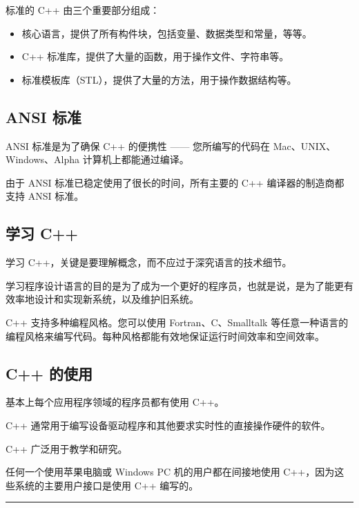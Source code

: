 \documentclass[
]{article}
\providecommand{\tightlist}{%
  \setlength{\itemsep}{0pt}\setlength{\parskip}{0pt}}
\begin{document}
标准的 C++ 由三个重要部分组成：

\begin{itemize}
\tightlist
\item
  核心语言，提供了所有构件块，包括变量、数据类型和常量，等等。
\item
  C++ 标准库，提供了大量的函数，用于操作文件、字符串等。
\item
  标准模板库（STL），提供了大量的方法，用于操作数据结构等。
\end{itemize}

\hypertarget{ansi-ux6807ux51c6}{%
\subsection{ANSI 标准}\label{ansi-ux6807ux51c6}}

ANSI 标准是为了确保 C++ 的便携性 ------ 您所编写的代码在
Mac、UNIX、Windows、Alpha 计算机上都能通过编译。

由于 ANSI 标准已稳定使用了很长的时间，所有主要的 C++
编译器的制造商都支持 ANSI 标准。

\hypertarget{ux5b66ux4e60-c}{%
\subsection{学习 C++}\label{ux5b66ux4e60-c}}

学习 C++，关键是要理解概念，而不应过于深究语言的技术细节。

学习程序设计语言的目的是为了成为一个更好的程序员，也就是说，是为了能更有效率地设计和实现新系统，以及维护旧系统。

C++ 支持多种编程风格。您可以使用 Fortran、C、Smalltalk
等任意一种语言的编程风格来编写代码。每种风格都能有效地保证运行时间效率和空间效率。

\hypertarget{c-ux7684ux4f7fux7528}{%
\subsection{C++ 的使用}\label{c-ux7684ux4f7fux7528}}

基本上每个应用程序领域的程序员都有使用 C++。

C++ 通常用于编写设备驱动程序和其他要求实时性的直接操作硬件的软件。

C++ 广泛用于教学和研究。

任何一个使用苹果电脑或 Windows PC 机的用户都在间接地使用
C++，因为这些系统的主要用户接口是使用 C++ 编写的。

\begin{center}\rule{0.5\linewidth}{0.5pt}\end{center}
\end{document}
